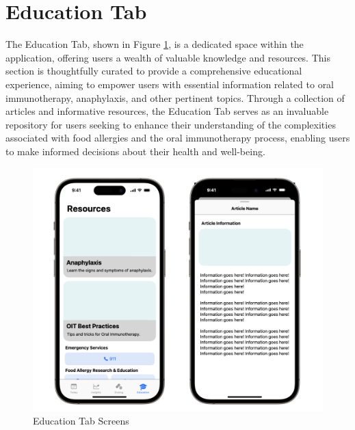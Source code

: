 \section{Education Tab}

The Education Tab, shown in Figure \ref{fig:education-tab}, is a dedicated space within the application, offering users a wealth of valuable knowledge and resources. This section is thoughtfully curated to provide a comprehensive educational experience, aiming to empower users with essential information related to oral immunotherapy, anaphylaxis, and other pertinent topics. Through a collection of articles and informative resources, the Education Tab serves as an invaluable repository for users seeking to enhance their understanding of the complexities associated with food allergies and the oral immunotherapy process, enabling users to make informed decisions about their health and well-being.

\begin{figure}[H]
    \centering
    \includegraphics[width=0.5\linewidth]{thesis//chapters//images/education-tab-screens.png}
    \caption{Education Tab Screens}
    \label{fig:education-tab}
\end{figure}

